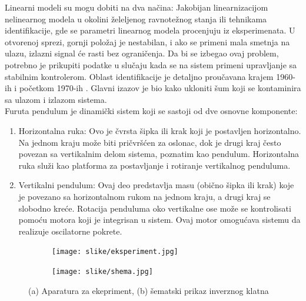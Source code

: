 \documentclass[a4paper,11pt]{article}
\theoremstyle{definition} \newtheorem{deff}{Definicija}[section]
\theoremstyle{definition} \newtheorem{prim}[deff]{Primer}
\theoremstyle{plain} \newtheorem{teor}[deff]{Teorema}
\begin{document}
	Linearni modeli su mogu dobiti na dva načina: Jakobijan linearnizacijom nelinearnog modela u okolini želeljenog ravnotežnog stanja ili tehnikama identifikacije, gde se parametri linearnog modela procenjuju iz eksperimenata. U otvorenoj sprezi, gornji položaj je nestabilan, i ako se primeni mala smetnja na ulazu, izlazni signal će rasti bez ograničenja. Da bi se izbegao ovaj problem, potrebno je prikupiti podatke u slučaju kada se na sistem primeni upravljanje sa stabilnim kontrolerom.  Oblast identifikacije je detaljno proučavana krajem 1960-ih i početkom 1970-ih  \cite{identifikacija}. Glavni izazov je bio kako ukloniti šum koji se kontaminira sa ulazom i izlazom sistema.  \\
	
	
	Furuta pendulum je dinamički sistem koji se sastoji od dve osnovne komponente: \\
	
	\begin{enumerate}
		\item Horizontalna ruka: Ovo je čvrsta šipka ili krak koji je postavljen horizontalno. Na jednom kraju može biti pričvršćen za oslonac, dok je drugi kraj često povezan sa vertikalnim delom sistema, poznatim kao pendulum. Horizontalna ruka služi kao platforma za postavljanje i rotiranje vertikalnog penduluma. \\
		
		\item Vertikalni pendulum: Ovaj deo predstavlja masu (obično šipka ili krak) koje je povezano sa horizontalnom rukom na jednom kraju, a drugi kraj se slobodno kreće. Rotacija penduluma oko vertikalne ose može se kontrolisati pomoću motora koji je integrisan u sistem. Ovaj motor omogućava sistemu da realizuje oscilatorne pokrete.\\
		
	\end{enumerate}
	
	
	\begin{figure}[!htb]
		\centering
		\begin{subfigure}{0.3\linewidth}
			\centering
			\texttt{[image: slike/eksperiment.jpg]}
			\caption{}
			\label{fig:eksper}
		\end{subfigure}
		\hfill
		\begin{subfigure}{0.5\linewidth}
			\centering
			\texttt{[image: slike/shema.jpg]}
			\caption{}
			\label{fig:schema}
		\end{subfigure}
		\caption{(a) Aparatura za ekepriment, (b) šematski prikaz inverznog klatna \cite{inicijalna} }
	\end{figure}
	
\end{document}
